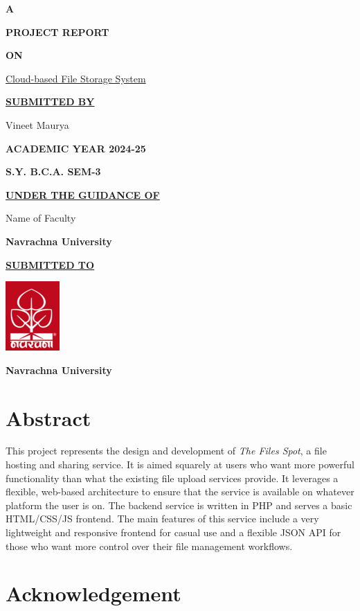 \documentclass[12pt,a4paper]{report}
\begin{document}
\begin{center}
	\textbf{\LARGE{A}}

	\textbf{\LARGE{PROJECT REPORT}}

	\textbf{\LARGE{ON}}

	\Large{\underline{Cloud-based File Storage System}}
	\vspace{1cm}

	\textbf{\underline{SUBMITTED BY}}

	Vineet Maurya
	\vspace{1cm}

	\textbf{ACADEMIC YEAR 2024-25}

	\textbf{S.Y. B.C.A. SEM-3}
	\vspace{1cm}

	\textbf{\underline{UNDER THE GUIDANCE OF}}

	Name of Faculty

	\textbf{Navrachna University}
	\vspace{1cm}

	\textbf{\underline{SUBMITTED TO}}
	\vspace{0.5cm}

	\includegraphics{nuv_logo.png}
	\vspace{0.5cm}

	\textbf{Navrachna University}
\end{center}
\newpage
{}
\setcounter{page}{1}
\chapter*{Abstract}
This project represents the design and development of \textit{The Files Spot}, a file hosting and sharing service. It is aimed squarely at users who want more powerful functionality than what the existing file upload services provide. It leverages a flexible, web-based architecture to ensure that the service is available on whatever platform the user is on. The backend service is written in PHP and serves a basic HTML/CSS/JS frontend. The main features of this service include a very lightweight and responsive frontend for casual use and a flexible JSON API for those who want more control over their file management workflows.
\newpage
\chapter*{Acknowledgement}
\end{document}
